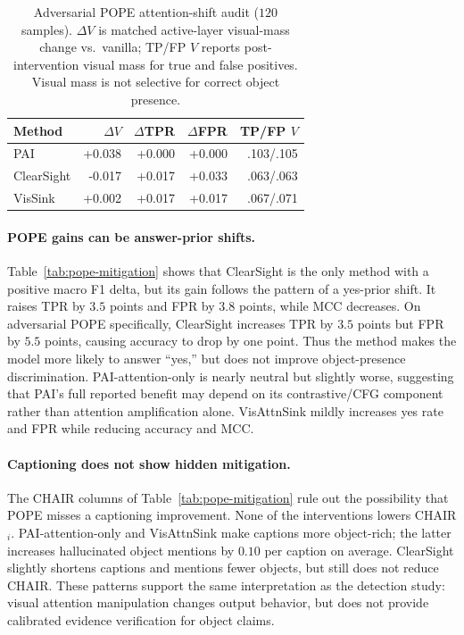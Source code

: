 \documentclass[letterpaper]{article} \usepackage[submission]{aaai2027}  \usepackage[hyphens]{url}  \usepackage{graphicx} \urlstyle{rm} \def\UrlFont{\rm}  \usepackage{natbib}  \usepackage{caption} \frenchspacing
\begin{document}
\begin{table}[t]
\centering
\scriptsize
\setlength{\tabcolsep}{3.1pt}
\begin{tabular}{lrrrr}
\toprule
Method & $\Delta V$ & $\Delta$TPR & $\Delta$FPR & TP/FP $V$ \\
\midrule
PAI & +0.038 & +0.000 & +0.000 & .103/.105 \\
ClearSight & -0.017 & +0.017 & +0.033 & .063/.063 \\
VisSink & +0.002 & +0.017 & +0.017 & .067/.071 \\
\bottomrule
\end{tabular}
\caption{Adversarial POPE attention-shift audit ($120$ samples). $\Delta V$ is matched active-layer visual-mass change vs.\ vanilla; TP/FP $V$ reports post-intervention visual mass for true and false positives. Visual mass is not selective for correct object presence.}
\label{tab:attention-audit}
\end{table}
 

\paragraph{POPE gains can be answer-prior shifts.} Table~\ref{tab:pope-mitigation} shows that ClearSight is the only method with a positive macro F1 delta, but its gain follows the pattern of a yes-prior shift. It raises TPR by $3.5$ points and FPR by $3.8$ points, while MCC decreases. On adversarial POPE specifically, ClearSight increases TPR by $3.5$ points but FPR by $5.5$ points, causing accuracy to drop by one point. Thus the method makes the model more likely to answer ``yes,'' but does not improve object-presence discrimination. PAI-attention-only is nearly neutral but slightly worse, suggesting that PAI's full reported benefit may depend on its contrastive/CFG component rather than attention amplification alone. VisAttnSink mildly increases yes rate and FPR while reducing accuracy and MCC.

\paragraph{Captioning does not show hidden mitigation.} The CHAIR columns of Table~\ref{tab:pope-mitigation} rule out the possibility that POPE misses a captioning improvement. None of the interventions lowers CHAIR$_i$. PAI-attention-only and VisAttnSink make captions more object-rich; the latter increases hallucinated object mentions by $0.10$ per caption on average. ClearSight slightly shortens captions and mentions fewer objects, but still does not reduce CHAIR. These patterns support the same interpretation as the detection study: visual attention manipulation changes output behavior, but does not provide calibrated evidence verification for object claims.
\end{document}

